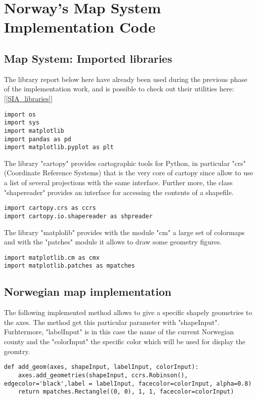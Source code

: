 \chapter{Norway's Map System Implementation Code}

\section{Map System: Imported libraries}
\label{Map_libraries}
The library report below here have already been used during the previous phase of the implementation work, and is possible to check out their utilities here: [\ref{SIA_libraries}]
\begin{lstlisting}
import os
import sys
import matplotlib
import pandas as pd
import matplotlib.pyplot as plt
\end{lstlisting}

The library "cartopy" provides cartographic tools for Python, in particular "crs" (Coordinate Reference Systems) that is the very core of cartopy since allow to use a list of several projections with the same interface. Further more, the class "shapereader" provides an interface for accessing the contents of a shapefile.
\begin{lstlisting}
import cartopy.crs as ccrs
import cartopy.io.shapereader as shpreader
\end{lstlisting}

The library "matplolib" provides with the module "cm" a large set of colormaps and with the "patches" module it allows to draw some geometry figures.
\begin{lstlisting}
import matplotlib.cm as cmx
import matplotlib.patches as mpatches
\end{lstlisting}

\section{Norwegian map implementation}
\label{Map_system_implementation}
The following implemented method allows to give a specific shapely geometries to the axes. The method get this particular parameter with "shapeInput". Furhtermore, "labelInput" is in this case the name of the current Norwegian county and the "colorInput" the specific color which will be used for display the geomtry.
\begin{lstlisting}
def add_geom(axes, shapeInput, labelInput, colorInput):
	axes.add_geometries(shapeInput, ccrs.Robinson(), edgecolor='black',label = labelInput, facecolor=colorInput, alpha=0.8)
	return mpatches.Rectangle((0, 0), 1, 1, facecolor=colorInput)
\end{lstlisting}

